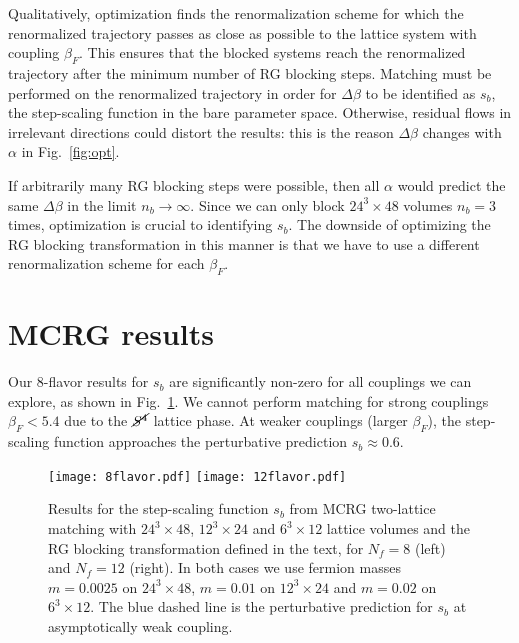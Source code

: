\documentclass{PoS}
\newcommand{\al}{\ensuremath{\alpha} }
\newcommand{\be}{\ensuremath{\beta} }
\newcommand{\De}{\ensuremath{\Delta} }
\newcommand{\X}{\ensuremath{\!\times\!} }
\newcommand{\Sb}{\ensuremath{\cancel{S^4}} }
\newcommand{\fig}[1]{Fig.~\ref{#1}}
\begin{document}
Qualitatively, optimization finds the renormalization scheme for which the renormalized trajectory passes as close as possible to the lattice system with coupling $\be_F$.
This ensures that the blocked systems reach the renormalized trajectory after the minimum number of RG blocking steps.
Matching must be performed on the renormalized trajectory in order for $\De\be$ to be identified as $s_b$, the step-scaling function in the bare parameter space.
Otherwise, residual flows in irrelevant directions could distort the results: this is the reason $\De\be$ changes with \al in \fig{fig:opt}.

If arbitrarily many RG blocking steps were possible, then all \al would predict the same $\De\be$ in the limit $n_b \to \infty$.
Since we can only block $24^3\X48$ volumes $n_b = 3$ times, optimization is crucial to identifying $s_b$.
The downside of optimizing the RG blocking transformation in this manner is that we have to use a different renormalization scheme for each $\be_F$.



\section{\label{sec:MCRG_results}MCRG results} %
Our 8-flavor results for $s_b$ are significantly non-zero for all couplings we can explore, as shown in \fig{fig:MCRG}.
We cannot perform matching for strong couplings $\be_F < 5.4$ due to the \Sb lattice phase.
At weaker couplings (larger $\be_F$), the step-scaling function approaches the perturbative prediction $s_b \approx 0.6$.

\begin{figure}[htpb]
  \centering
  \texttt{[image: 8flavor.pdf]}\hfill
  \texttt{[image: 12flavor.pdf]}
  \caption{Results for the step-scaling function $s_b$ from MCRG two-lattice matching with $24^3\X48$, $12^3\X24$ and $6^3\X12$ lattice volumes and the RG blocking transformation defined in the text, for $N_f = 8$ (left) and $N_f = 12$ (right).  In both cases we use fermion masses $m = 0.0025$ on $24^3\X48$, $m = 0.01$ on $12^3\X24$ and $m = 0.02$ on $6^3\X12$.  The blue dashed line is the perturbative prediction for $s_b$ at asymptotically weak coupling.}
  \label{fig:MCRG}
\end{figure}
\end{document}
